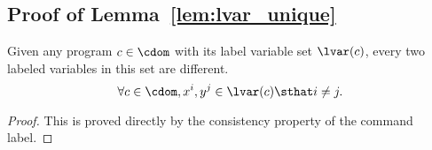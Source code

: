   \subsection{Proof of Lemma~\ref{lem:lvar_unique}}
  \label{apdx:lvar_unique}
  \begin{lemma}
    Given any program $c \in \cdom$ with its label variable set $\lvar(c)$,
    every two labeled variables in this set are different.
    \[
      \forall c \in \cdom, x^i, y^j \in \lvar(c) \sthat i \neq j.
      \]
  \end{lemma}
  \begin{proof}
    This is proved directly by the consistency property of the command label.
  \end{proof}
  
